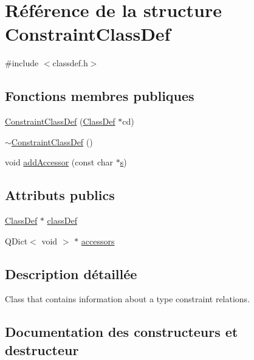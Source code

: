 \hypertarget{struct_constraint_class_def}{}\section{Référence de la structure Constraint\+Class\+Def}
\label{struct_constraint_class_def}


{\ttfamily \#include $<$classdef.\+h$>$}

\subsection*{Fonctions membres publiques}
\begin{DoxyCompactItemize}
\item 
\hyperlink{struct_constraint_class_def_a511b92d880437fdff407845cc372ca1d}{Constraint\+Class\+Def} (\hyperlink{class_class_def}{Class\+Def} $\ast$cd)
\item 
\hyperlink{struct_constraint_class_def_a4ca4a048dae5ff6bbd9376e947e7cc0e}{$\sim$\+Constraint\+Class\+Def} ()
\item 
void \hyperlink{struct_constraint_class_def_aefe7422f7e2f4386076764d7ea5e3800}{add\+Accessor} (const char $\ast$\hyperlink{060__command__switch_8tcl_a011c73f2dbb87635a3b4206c72355f6e}{s})
\end{DoxyCompactItemize}
\subsection*{Attributs publics}
\begin{DoxyCompactItemize}
\item 
\hyperlink{class_class_def}{Class\+Def} $\ast$ \hyperlink{struct_constraint_class_def_a19b68e8a482c234e891caf07a74608ef}{class\+Def}
\item 
Q\+Dict$<$ void $>$ $\ast$ \hyperlink{struct_constraint_class_def_ac683f0a91d18455baad63d1582aa6e5b}{accessors}
\end{DoxyCompactItemize}


\subsection{Description détaillée}
Class that contains information about a type constraint relations. 

\subsection{Documentation des constructeurs et destructeur}
\hypertarget{struct_constraint_class_def_a511b92d880437fdff407845cc372ca1d}{}
